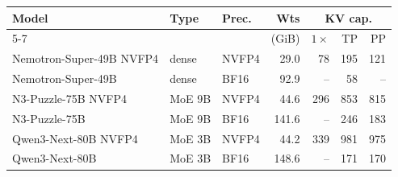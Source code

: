 \begin{tabular}{@{}l l l r r r r@{}}
\toprule
Model & Type & Prec. & Wts & \multicolumn{3}{c}{KV cap.} \\
\cmidrule(lr){5-7}
 & & & (GiB) & $1\times$ & TP & PP \\
\midrule
Nemotron-Super-49B NVFP4 & dense & NVFP4 & 29.0 & 78 & 195 & 121 \\
Nemotron-Super-49B & dense & BF16 & 92.9 & -- & 58 & -- \\
N3-Puzzle-75B NVFP4 & MoE 9B & NVFP4 & 44.6 & 296 & 853 & 815 \\
N3-Puzzle-75B & MoE 9B & BF16 & 141.6 & -- & 246 & 183 \\
Qwen3-Next-80B NVFP4 & MoE 3B & NVFP4 & 44.2 & 339 & 981 & 975 \\
Qwen3-Next-80B & MoE 3B & BF16 & 148.6 & -- & 171 & 170 \\
\bottomrule
\end{tabular}
